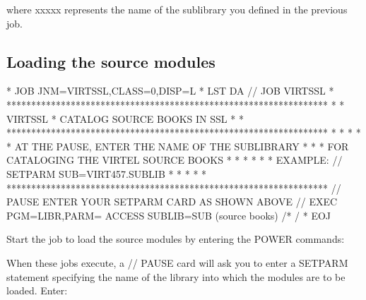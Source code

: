 \documentclass[letterpaper,10pt,english]{sphinxmanual}
\begin{document}
\begin{sphinxVerbatim}[commandchars=\\\{\}]
  
\end{sphinxVerbatim}

where xxxxx represents the name of the sublibrary you defined in the previous job.


\subsection{Loading the source modules}
\label{\detokenize{Installation_Guide:loading-the-source-modules}}
\begin{sphinxVerbatim}[commandchars=\\\{\}]
* \PYGZdl{}\PYGZdl{} JOB JNM=VIRTSSL,CLASS=0,DISP=L
* \PYGZdl{}\PYGZdl{} LST DA
// JOB VIRTSSL
* *****************************************************************
* * VIRTSSL * CATALOG SOURCE BOOKS IN SSL                         *
* *****************************************************************
* *                                                               *
* * AT THE PAUSE, ENTER THE NAME OF THE SUB\PYGZhy{}LIBRARY               *
* * FOR CATALOGING THE VIRTEL SOURCE BOOKS                        *
* *                                                               *
* * EXAMPLE: // SETPARM SUB=\PYGZsq{}VIRT457.SUBLIB\PYGZsq{}                      *
* *                                                               *
* *****************************************************************
// PAUSE ENTER YOUR SETPARM CARD AS SHOWN ABOVE
// EXEC PGM=LIBR,PARM=\PYGZsq{} ACCESS SUBLIB=\PYGZam{}SUB\PYGZsq{}
        (source books)
/*
/\PYGZam{}
* \PYGZdl{}\PYGZdl{} EOJ
\end{sphinxVerbatim}


Start the job to load the source modules by entering the POWER commands:

\begin{sphinxVerbatim}[commandchars=\\\{\}]
 
 
 
 
\end{sphinxVerbatim}

When these jobs execute, a // PAUSE card will ask you to enter a SETPARM statement specifying the name of the library into which the modules are to be loaded. Enter:
\end{document}
